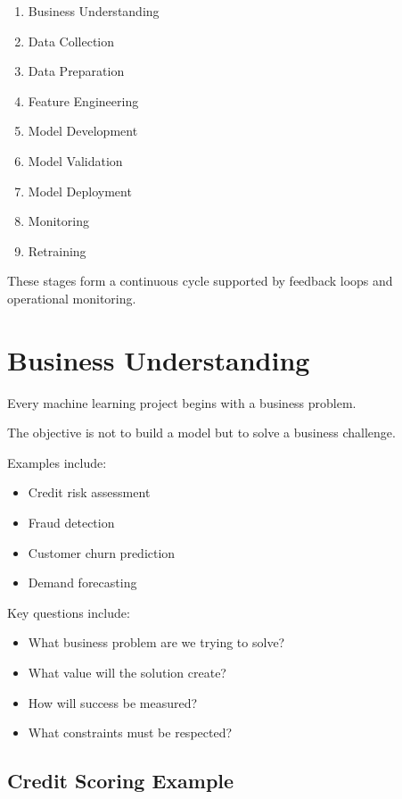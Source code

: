 \begin{enumerate}
    \item Business Understanding
    \item Data Collection
    \item Data Preparation
    \item Feature Engineering
    \item Model Development
    \item Model Validation
    \item Model Deployment
    \item Monitoring
    \item Retraining
\end{enumerate}

These stages form a continuous cycle supported by feedback loops and operational monitoring.

\section{Business Understanding}

Every machine learning project begins with a business problem.

The objective is not to build a model but to solve a business challenge.

Examples include:

\begin{itemize}
    \item Credit risk assessment
    \item Fraud detection
    \item Customer churn prediction
    \item Demand forecasting
\end{itemize}

Key questions include:

\begin{itemize}
    \item What business problem are we trying to solve?
    \item What value will the solution create?
    \item How will success be measured?
    \item What constraints must be respected?
\end{itemize}

\subsection{Credit Scoring Example}

